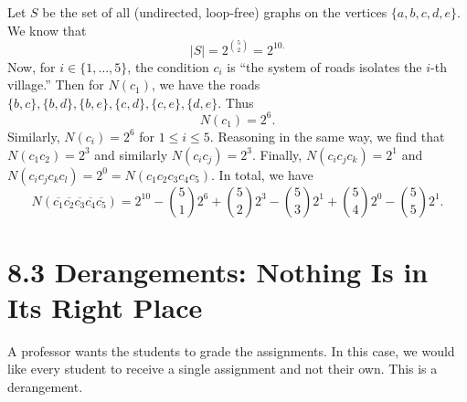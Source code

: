 \documentclass[11pt]{article}
\begin{document}
\begin{enumerate}
\begin{figure}[H]
        \end{figure}
    \end{enumerate}

    Let $S$ be the set of all (undirected, loop-free) graphs on the vertices \(\{a,b,c,d,e\}\). We know that \[|S| = 2^{\binom{5}{2}} = 2^{10.}\] Now, for \(i \in \{1, \dots, 5\}\), the condition \(c_i\) is ``the system of roads isolates the $i$-th village.'' Then for \(N(c_1)\), we have the roads \(\{b,c\}, \{b,d\}, \{b,e\}, \{c,d\}, \{c,e\}, \{d,e\}\). Thus \[N(c_1) = 2^6.\] Similarly, \(N(c_i) = 2^6\) for \(1 \leq i \leq 5\). Reasoning in the same way, we find that \(N(c_1 c_2) = 2^3\) and similarly \(N(c_i c_j) = 2^3\). Finally, \(N(c_i c_j c_k) = 2^1\) and \(N(c_i c_j c_k c_l) = 2^0 = N(c_1 c_2 c_3 c_4 c_5)\). In total, we have \[N(\overline{c_1} \overline{c_2} \overline{c_3} \overline{c_4} \overline{c_5}) = 2^{10} - \binom{5}{1} 2^6 + \binom{5}{2} 2^3 - \binom{5}{3} 2^1 + \binom{5}{4} 2^0 - \binom{5}{5} 2^1.\]

    \section{8.3 Derangements: Nothing Is in Its Right Place}

    A professor wants the students to grade the assignments. In this case, we would like every student to receive a single assignment and not their own. This is a derangement. 

    \vspace{1em}
\end{document}
